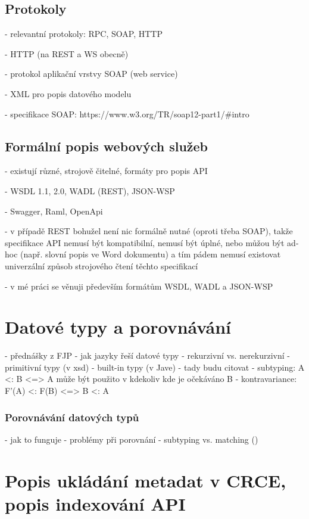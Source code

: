 \documentclass[czech,DP]{thesiskiv}
\begin{document}
\section{Protokoly}

- relevantní protokoly: RPC, SOAP, HTTP

- HTTP (na REST a WS obecně)

- protokol aplikační vrstvy SOAP (web service)

- XML pro popis datového modelu

- specifikace SOAP: https://www.w3.org/TR/soap12-part1/\#intro

\section{Formální popis webových služeb}

- existují různé, strojově čitelné, formáty pro popis API

- WSDL 1.1, 2.0, WADL (REST), JSON-WSP

- Swagger, Raml, OpenApi

- v případě REST bohužel není nic formálně nutné (oproti třeba SOAP), takže specifikace API nemusí být kompatibilní, nemusí být úplné, nebo můžou být ad-hoc (např. slovní popis ve Word dokumentu) a tím pádem nemusí existovat univerzální způsob strojového čtení těchto specifikací

- v mé práci se věnuji především formátům WSDL, WADL a JSON-WSP
 
\chapter{Datové typy a porovnávání}

- přednášky z FJP
- jak jazyky řeší datové typy
	- rekurzivní vs. nerekurzivní
- primitivní typy (v xsd)
- built-in typy (v Jave)
- tady budu citovat \cite{abadi1995subytping}
	- subtyping: A <: B <=> A může být použito v kdekoliv kde je očekáváno B
	- kontravariance: F'(A) <: F(B) <=> B <: A

\subsection{Porovnávání datových typů}

 - jak to funguje
 - problémy při porovnání
 - subtyping vs. matching (\cite{abadi1995subytping})


\chapter{Popis ukládání metadat v CRCE, popis indexování API}
\end{document}
